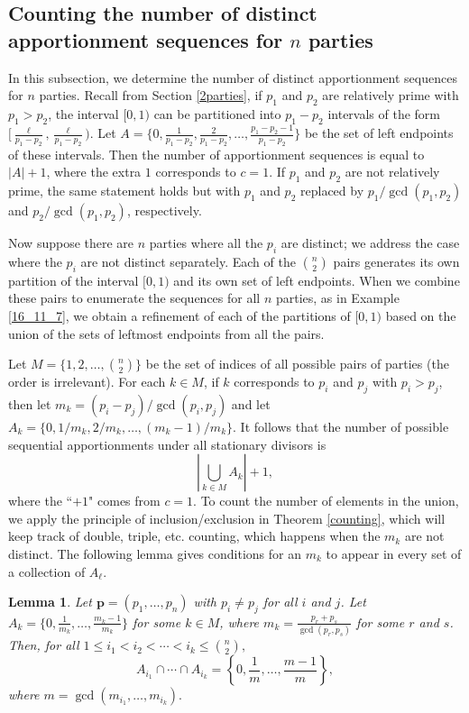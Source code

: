 \documentclass[pdflatex,sn-mathphys-num]{sn-jnl}
\theoremstyle{thmstyleone}%
\newtheorem{lemma}{Lemma}
\theoremstyle{thmstyletwo}%
\theoremstyle{thmstylethree}%
\begin{document}
\subsection{Counting the number of distinct apportionment sequences for $n$ parties}
 
In this subsection, we  determine the number of distinct apportionment sequences for $n$ parties. Recall  from Section \ref{2parties}, if $p_1$ and $p_2$ are relatively prime with $p_1>p_2$, the interval $[0, 1)$ can be partitioned into $p_1-p_2$ intervals of the form $[\frac{\ell}{p_1-p_2}, \frac{\ell}{p_1-p_2})$.  Let $A=\{0, \frac{1}{p_1-p_2},  \frac{2}{p_1-p_2}, \ldots,  \frac{p_1-p_2-1}{p_1-p_2}\}$ be the set of left endpoints of these intervals. Then the number of apportionment sequences is equal to $\vert A \vert + 1$, where the extra $1$ corresponds to $c=1$.  If $p_1$ and $p_2$ are not relatively prime, the same statement holds but with $p_1$ and $p_2$ replaced by $p_1/\gcd(p_1, p_2)$ and $p_2/\gcd(p_1, p_2)$, respectively. 

Now suppose there are $n$ parties where all the $p_i$ are distinct; we address the case where the $p_i$ are not distinct separately. Each of the $\binom{n}{2}$ pairs generates its own partition of the interval $[0, 1)$ and its own set of left endpoints.   When we combine these pairs to enumerate the sequences for all $n$ parties, as in Example \ref{16_11_7}, we obtain a refinement of each of the partitions of $[0, 1)$ based on the  union of  the sets of leftmost endpoints from all the pairs.

Let $M=\{1, 2, \ldots, \binom{n}{2}\}$ be the set of indices of all possible pairs of parties (the order is irrelevant). For each $k \in M$, if $k$ corresponds to $p_i$ and $p_j$ with $p_i>p_j$, then let $m_k = (p_i  - p_j)/\gcd(p_i, p_j)$ and let $A_k = \{0, 1/m_k, 2/m_k, \ldots, (m_k - 1)/m_k \}$.  It follows that the number of possible sequential apportionments under all stationary divisors  is 
$$\left\vert \bigcup_{k \in M} A_k \right\vert +1,$$
where the ``$+1$" comes from $c=1$.  To count the number of elements in the union, we apply the principle of inclusion/exclusion in Theorem \ref{counting}, which will keep track of double, triple, etc. counting, which happens when the $m_k$ are not distinct.  The following lemma gives conditions for an $m_k$ to appear in every set of a collection of $A_{\ell}$.  

\begin{lemma} \label{intersection} Let $\mathbf p = (p_1, \ldots, p_n)$ with $p_i \ne p_j$ for all $i$ and $j$.
Let $A_k=\{0, \frac{1}{m_k}, \ldots, \frac{m_k-1}{m_k}\}$ for some $k \in M$, where $m_k = \frac{p_r + p_s}{\gcd(p_r,p_s)}$ for some $r$ and $s$. Then, for all $1 \le i_1 < i_2 < \cdots <i_k  \le \binom{n}{2},$ 
$$A_{i_1} \cap  \cdots \cap A_{i_k}  =\left\{0, \frac{1}{m}, \ldots, \frac{m-1}{m}\right\},$$ 
where $m= \gcd(m_{i_1}, \ldots, m_{i_k}).$
\end{lemma}
\end{document}
